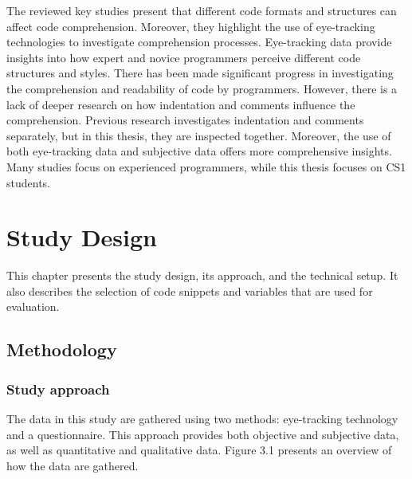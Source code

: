 The reviewed key studies present that different code formats and structures can affect code comprehension. Moreover, they highlight the use of eye-tracking technologies to investigate comprehension processes.  Eye-tracking data provide insights into how expert and novice programmers perceive different code structures and styles. There has been made significant progress in investigating the comprehension and readability of code by programmers.  However, there is a lack of deeper research on how indentation and comments influence the comprehension.  Previous research investigates indentation and comments separately, but in this thesis, they are inspected together. Moreover, the use of both eye-tracking data and subjective data offers more comprehensive insights. Many studies focus on experienced programmers, while this thesis focuses on CS1 students. 





\chapter{Study Design}

This chapter presents the study design, its approach, and the technical setup.  It also describes the selection of code snippets and variables that are used for evaluation.

\section{Methodology}

\subsection{Study approach} The data in this study are gathered using two methods: eye-tracking technology and a questionnaire. This approach provides both objective and subjective data, as well as quantitative and qualitative data. Figure 3.1 presents an overview of how the data are gathered. 



